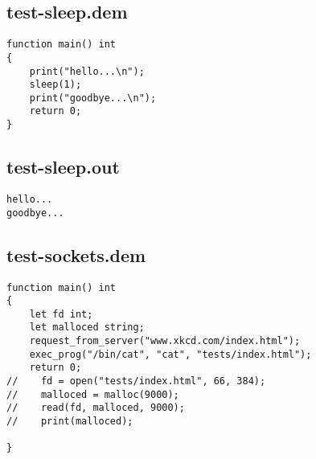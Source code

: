\subsection{test-sleep.dem}
\begin{lstlisting}
function main() int
{
    print("hello...\n");
    sleep(1);
    print("goodbye...\n");
    return 0;
}
\end{lstlisting}
\subsection{test-sleep.out}
\begin{lstlisting}
hello...
goodbye...
\end{lstlisting}
\subsection{test-sockets.dem}
\begin{lstlisting}
function main() int
{
    let fd int;
    let malloced string;
    request_from_server("www.xkcd.com/index.html");
    exec_prog("/bin/cat", "cat", "tests/index.html");
    return 0;
//    fd = open("tests/index.html", 66, 384);
//    malloced = malloc(9000);
//    read(fd, malloced, 9000);
//    print(malloced);
    
}
\end{lstlisting}
